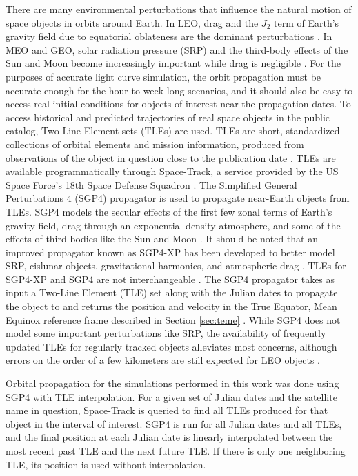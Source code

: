 There are many environmental perturbations that influence the natural motion of space objects in orbits around Earth. In LEO, drag and the $J_2$ term of Earth's gravity field due to equatorial oblateness are the dominant perturbations \cite{frueh2019notes}. In MEO and GEO, solar radiation pressure (SRP) and the third-body effects of the Sun and Moon become increasingly important while drag is negligible \cite{frueh2019notes}. For the purposes of accurate light curve simulation, the orbit propagation must be accurate enough for the hour to week-long scenarios, and it should also be easy to access real initial conditions for objects of interest near the propagation dates. To access historical and predicted trajectories of real space objects in the public catalog, Two-Line Element sets (TLEs) are used. TLEs are short, standardized collections of orbital elements and mission information, produced from observations of the object in question close to the publication date \cite{vallado4ed}. TLEs are available programmatically through Space-Track, a service provided by the US Space Force's 18th Space Defense Squadron \cite{spacetrack}. The Simplified General Perturbations 4 (SGP4) propagator is used to propagate near-Earth objects from TLEs. SGP4 models the secular effects of the first few zonal terms of Earth's gravity field, drag through an exponential density atmosphere, and some of the effects of third bodies like the Sun and Moon \cite{vallado4ed}. It should be noted that an improved propagator known as SGP4-XP has been developed to better model SRP, cislunar objects, gravitational harmonics, and atmospheric drag \cite{payne2022}. TLEs for SGP4-XP and SGP4 are not interchangeable \cite{payne2022}. The SGP4 propagator takes as input a Two-Line Element (TLE) set along with the Julian dates to propagate the object to and returns the position and velocity in the True Equator, Mean Equinox reference frame described in Section \ref{sec:teme} \cite{vallado4ed}. While SGP4 does not model some important perturbations like SRP, the availability of frequently updated TLEs for regularly tracked objects alleviates most concerns, although errors on the order of a few kilometers are still expected for LEO objects \cite{vallado4ed}. 

Orbital propagation for the simulations performed in this work was done using SGP4 with TLE interpolation. For a given set of Julian dates and the satellite name in question, Space-Track is queried to find all TLEs produced for that object in the interval of interest. SGP4 is run for all Julian dates and all TLEs, and the final position at each Julian date is linearly interpolated between the most recent past TLE and the next future TLE. If there is only one neighboring TLE, its position is used without interpolation.


